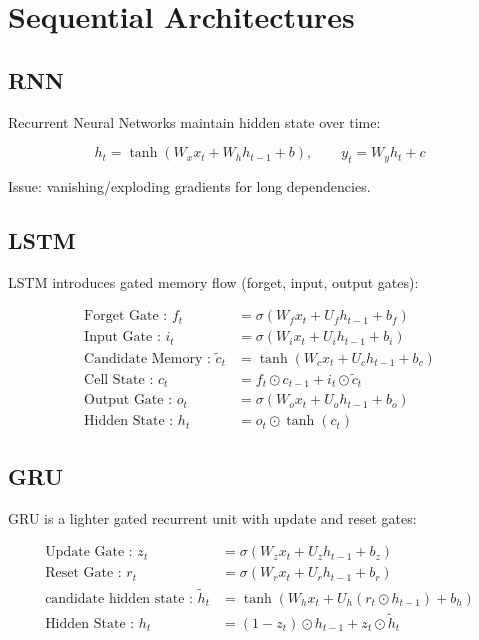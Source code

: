 \documentclass[10pt,a4paper]{article}
\begin{document}
\section{Sequential Architectures}

\subsection{RNN}
Recurrent Neural Networks maintain hidden state over time:


\[
h_t=\tanh(W_xx_t+W_hh_{t-1}+b),\qquad y_t=W_yh_t+c
\]

Issue: vanishing/exploding gradients for long dependencies.


\subsection{LSTM}
LSTM introduces gated memory flow (forget, input, output gates):


\begin{align*}
\text{Forget Gate : } f_t &= \sigma(W_f x_t + U_f h_{t-1} + b_f) \\\text{Input Gate : } i_t &= \sigma(W_i x_t + U_i h_{t-1} + b_i) \\\text{Candidate Memory : } \tilde{c}_t &= \tanh(W_c x_t + U_c h_{t-1} + b_c) \\\text{Cell State : } c_t &= f_t \odot c_{t-1} + i_t \odot \tilde{c}_t \\\text{Output Gate : } o_t &= \sigma(W_o x_t + U_o h_{t-1} + b_o) \\\text{Hidden State : } h_t &= o_t \odot \tanh(c_t)
\end{align*}



\subsection{GRU}
GRU is a lighter gated recurrent unit with update and reset gates:

\begin{align*} 
\text{Update Gate : }z_t  &= \sigma(W_z x_t + U_z h_{t-1} + b_z) \\
\text{Reset Gate : }r_t &= \sigma(W_r x_t + U_r h_{t-1} + b_r) \\
\text{candidate hidden state : } \tilde{h}_t &= \tanh\!\left(W_h x_t + U_h (r_t \odot h_{t-1}) + b_h \right) \\
\text{Hidden State : }h_t &= (1 - z_t) \odot h_{t-1} + z_t \odot \tilde{h}_t
\end{align*}
\end{document}
